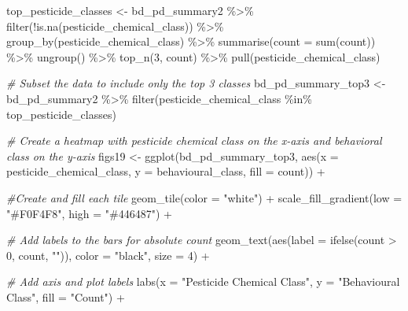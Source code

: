 \documentclass[
]{article}
\newenvironment{Shaded}{\begin{snugshade}}{\end{snugshade}}
\newcommand{\AttributeTok}[1]{\textcolor[rgb]{0.77,0.63,0.00}{#1}}
\newcommand{\CommentTok}[1]{\textcolor[rgb]{0.56,0.35,0.01}{\textit{#1}}}
\newcommand{\DecValTok}[1]{\textcolor[rgb]{0.00,0.00,0.81}{#1}}
\newcommand{\FunctionTok}[1]{\textcolor[rgb]{0.00,0.00,0.00}{#1}}
\newcommand{\NormalTok}[1]{#1}
\newcommand{\OtherTok}[1]{\textcolor[rgb]{0.56,0.35,0.01}{#1}}
\newcommand{\SpecialCharTok}[1]{\textcolor[rgb]{0.00,0.00,0.00}{#1}}
\newcommand{\StringTok}[1]{\textcolor[rgb]{0.31,0.60,0.02}{#1}}
\begin{document}
\begin{Shaded}
\begin{Highlighting}[]
\NormalTok{top\_pesticide\_classes }\OtherTok{\textless{}{-}}\NormalTok{ bd\_pd\_summary2 }\SpecialCharTok{\%\textgreater{}\%}
  \FunctionTok{filter}\NormalTok{(}\SpecialCharTok{!}\FunctionTok{is.na}\NormalTok{(pesticide\_chemical\_class)) }\SpecialCharTok{\%\textgreater{}\%}
  \FunctionTok{group\_by}\NormalTok{(pesticide\_chemical\_class) }\SpecialCharTok{\%\textgreater{}\%}
  \FunctionTok{summarise}\NormalTok{(}\AttributeTok{count =} \FunctionTok{sum}\NormalTok{(count)) }\SpecialCharTok{\%\textgreater{}\%}
  \FunctionTok{ungroup}\NormalTok{() }\SpecialCharTok{\%\textgreater{}\%}
  \FunctionTok{top\_n}\NormalTok{(}\DecValTok{3}\NormalTok{, count) }\SpecialCharTok{\%\textgreater{}\%} 
  \FunctionTok{pull}\NormalTok{(pesticide\_chemical\_class)}

\CommentTok{\# Subset the data to include only the top 3 classes}
\NormalTok{bd\_pd\_summary\_top3 }\OtherTok{\textless{}{-}}\NormalTok{ bd\_pd\_summary2 }\SpecialCharTok{\%\textgreater{}\%}
  \FunctionTok{filter}\NormalTok{(pesticide\_chemical\_class }\SpecialCharTok{\%in\%}\NormalTok{ top\_pesticide\_classes)}

\CommentTok{\# Create a heatmap with pesticide chemical class on the x{-}axis and behavioral class on the y{-}axis}
\NormalTok{figs19 }\OtherTok{\textless{}{-}} \FunctionTok{ggplot}\NormalTok{(bd\_pd\_summary\_top3, }\FunctionTok{aes}\NormalTok{(}\AttributeTok{x =}\NormalTok{ pesticide\_chemical\_class, }\AttributeTok{y =}\NormalTok{ behavioural\_class, }\AttributeTok{fill =}\NormalTok{ count)) }\SpecialCharTok{+}
  
  \CommentTok{\#Create and fill each tile }
  \FunctionTok{geom\_tile}\NormalTok{(}\AttributeTok{color =} \StringTok{"white"}\NormalTok{) }\SpecialCharTok{+}
  \FunctionTok{scale\_fill\_gradient}\NormalTok{(}\AttributeTok{low =} \StringTok{"\#F0F4F8"}\NormalTok{, }\AttributeTok{high =} \StringTok{"\#446487"}\NormalTok{) }\SpecialCharTok{+}
  
  \CommentTok{\# Add labels to the bars for absolute count }
  \FunctionTok{geom\_text}\NormalTok{(}\FunctionTok{aes}\NormalTok{(}\AttributeTok{label =} \FunctionTok{ifelse}\NormalTok{(count }\SpecialCharTok{\textgreater{}} \DecValTok{0}\NormalTok{, count, }\StringTok{""}\NormalTok{)), }\AttributeTok{color =} \StringTok{"black"}\NormalTok{, }\AttributeTok{size =} \DecValTok{4}\NormalTok{) }\SpecialCharTok{+}  
  
  \CommentTok{\# Add axis and plot labels}
  \FunctionTok{labs}\NormalTok{(}\AttributeTok{x =} \StringTok{"Pesticide Chemical Class"}\NormalTok{, }\AttributeTok{y =} \StringTok{"Behavioural Class"}\NormalTok{, }\AttributeTok{fill =} \StringTok{"Count"}\NormalTok{) }\SpecialCharTok{+}
  

\end{Highlighting}
\end{Shaded}
\end{document}
